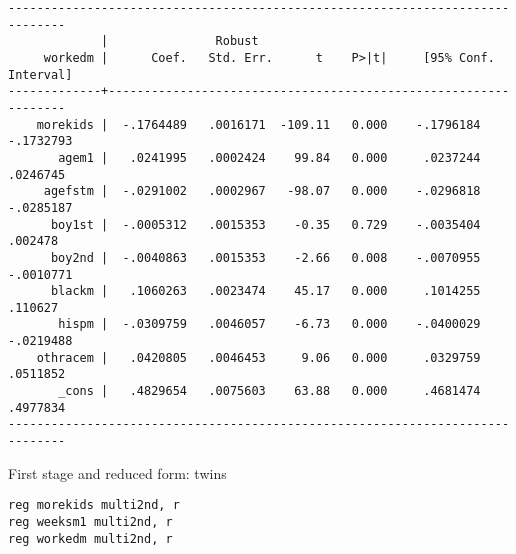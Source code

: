 \documentclass[11pt]{article}
\begin{document}
\begin{verbatim}
------------------------------------------------------------------------------
             |               Robust
     workedm |      Coef.   Std. Err.      t    P>|t|     [95% Conf. Interval]
-------------+----------------------------------------------------------------
    morekids |  -.1764489   .0016171  -109.11   0.000    -.1796184   -.1732793
       agem1 |   .0241995   .0002424    99.84   0.000     .0237244    .0246745
     agefstm |  -.0291002   .0002967   -98.07   0.000    -.0296818   -.0285187
      boy1st |  -.0005312   .0015353    -0.35   0.729    -.0035404     .002478
      boy2nd |  -.0040863   .0015353    -2.66   0.008    -.0070955   -.0010771
      blackm |   .1060263   .0023474    45.17   0.000     .1014255     .110627
       hispm |  -.0309759   .0046057    -6.73   0.000    -.0400029   -.0219488
    othracem |   .0420805   .0046453     9.06   0.000     .0329759    .0511852
       _cons |   .4829654   .0075603    63.88   0.000     .4681474    .4977834
------------------------------------------------------------------------------
\end{verbatim}

First stage and reduced form: twins
\begin{verbatim}
reg morekids multi2nd, r
reg weeksm1 multi2nd, r
reg workedm multi2nd, r
\end{verbatim}
\end{document}
